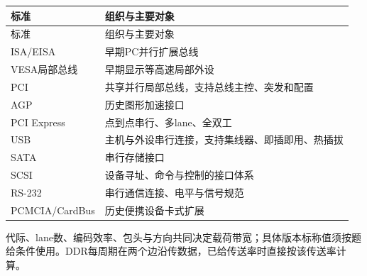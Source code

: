 \par\smallskip
{\fontsize{9.3}{12}\selectfont\setlength{\tabcolsep}{2.5pt}\setlength{\LTleft}{0pt}\setlength{\LTright}{0pt}
\begin{longtable}{@{}>{\raggedright\arraybackslash}p{}>{\raggedright\arraybackslash}p{}@{}}
\toprule
标准 & 组织与主要对象 \\

\midrule\endfirsthead\toprule
标准 & 组织与主要对象 \\

\midrule\endhead\bottomrule\endfoot
ISA/EISA & 早期PC并行扩展总线 \\

VESA局部总线 & 早期显示等高速局部外设 \\

PCI & 共享并行局部总线，支持总线主控、突发和配置 \\

AGP & 历史图形加速接口 \\

PCI Express & 点到点串行、多lane、全双工 \\

USB & 主机与外设串行连接，支持集线器、即插即用、热插拔 \\

SATA & 串行存储接口 \\

SCSI & 设备寻址、命令与控制的接口体系 \\

RS-232 & 串行通信连接、电平与信号规范 \\

PCMCIA/CardBus & 历史便携设备卡式扩展 \\

\end{longtable}}
\par\smallskip

代际、lane数、编码效率、包头与方向共同决定载荷带宽；具体版本标称值须按题给条件使用。DDR每周期在两个边沿传数据，已给传送率时直接按该传送率计算。
